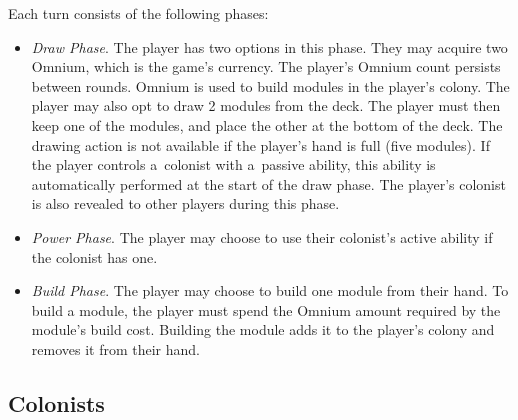 Each turn consists of the following phases:
\begin{itemize}
    \item \emph{Draw Phase}. The player has two options in this phase.
        They may acquire two Omnium, which is the game's currency. The player's
        Omnium count persists between rounds. Omnium is used to build modules in
        the player's colony.
        The player may also opt to draw 2 modules from the deck. The player
        must then keep one of the modules, and place the other at the bottom of the deck.
        The drawing action is not available if the player's hand is full (five modules).
        If the player controls a~colonist with a~passive ability, this ability
        is automatically performed at the start of the draw phase.
        The player's colonist is also revealed to other players during this phase.
    \item \emph{Power Phase}. The player may choose to use their colonist's active
        ability if the colonist has one.
    \item \emph{Build Phase}. The player may choose to build one module from their hand.
        To build a module, the player must spend the Omnium amount required by the module's
        build cost. Building the module adds it to the player's colony and removes
        it from their hand.
\end{itemize}

\clearpage
\subsection{Colonists}
\label{gamedesign:colonists}


